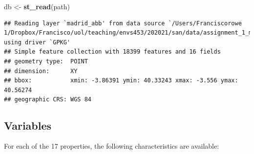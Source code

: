 \documentclass[
]{book}
\newenvironment{Shaded}{\begin{snugshade}}{\end{snugshade}}
\newcommand{\KeywordTok}[1]{\textcolor[rgb]{0.13,0.29,0.53}{\textbf{#1}}}
\newcommand{\NormalTok}[1]{#1}
\newcommand{\StringTok}[1]{\textcolor[rgb]{0.31,0.60,0.02}{#1}}
\begin{document}
\begin{Shaded}
\begin{Highlighting}[]
\NormalTok{db <-}\StringTok{ }\KeywordTok{st_read}\NormalTok{(path)}
\end{Highlighting}
\end{Shaded}

\begin{verbatim}
## Reading layer `madrid_abb' from data source `/Users/Franciscorowe 1/Dropbox/Francisco/uol/teaching/envs453/202021/san/data/assignment_1_madrid/madrid_abb.gpkg' using driver `GPKG'
## Simple feature collection with 18399 features and 16 fields
## geometry type:  POINT
## dimension:      XY
## bbox:           xmin: -3.86391 ymin: 40.33243 xmax: -3.556 ymax: 40.56274
## geographic CRS: WGS 84
\end{verbatim}

\hypertarget{variables}{%
\subsection*{Variables}\label{variables}}

For each of the 17 properties, the following characteristics are available:
\end{document}
